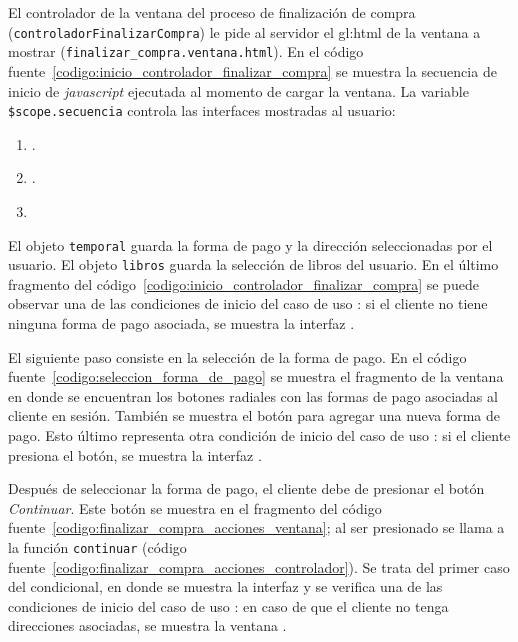 El controlador de la ventana del proceso de finalización de compra
(\texttt{controladorFinalizarCompra}) le pide al servidor el \gls{gl:html} de
la ventana a mostrar (\texttt{finalizar\_compra.ventana.html}). En el código
fuente~\ref{codigo:inicio_controlador_finalizar_compra} se muestra la secuencia
de inicio de \textit{javascript} ejecutada al momento de cargar la ventana. La
variable \texttt{\$scope.secuencia} controla las interfaces mostradas
al usuario:

\begin{enumerate}
  \item {}.
  \item {}.
  \item {}
\end{enumerate}


El objeto \texttt{temporal} guarda la forma de pago y la dirección
seleccionadas por el usuario. El objeto \texttt{libros} guarda la selección de
libros del usuario. En el último fragmento del
código~\ref{codigo:inicio_controlador_finalizar_compra} se puede observar una
de las condiciones de inicio del caso de uso
: si el cliente no tiene ninguna
forma de pago asociada, se muestra la interfaz
.

El siguiente paso consiste en la selección de la forma de pago. En el
código fuente~\ref{codigo:seleccion_forma_de_pago} se muestra el fragmento
de la ventana en donde se encuentran los botones radiales con las formas de
pago asociadas al cliente en sesión. También se muestra el botón para agregar
una nueva forma de pago. Esto último representa otra condición de inicio del
caso de uso : si el cliente presiona
el botón, se muestra la interfaz
.


Después de seleccionar la forma de pago, el cliente debe de presionar el botón
\textit{Continuar}. Este botón se muestra en el fragmento del código
fuente~\ref{codigo:finalizar_compra_acciones_ventana}; al ser presionado se
llama a la función \texttt{continuar} (código
fuente~\ref{codigo:finalizar_compra_acciones_controlador}). Se trata del primer
caso del condicional, en donde se muestra la interfaz
 y se verifica una de las
condiciones de inicio del caso de uso
: en caso de que el cliente no
tenga direcciones asociadas, se muestra la ventana
.


